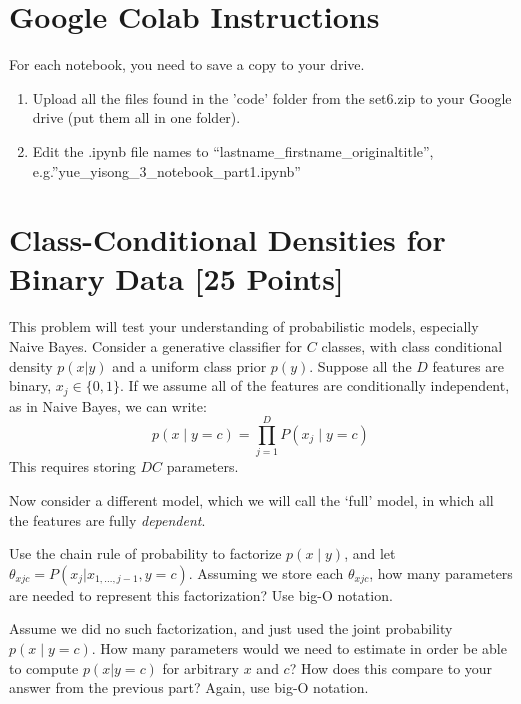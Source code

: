 \section*{Google Colab Instructions}

For each notebook, you need to save a copy to your drive.

\begin{enumerate}
	\item Upload all the files found in the 'code' folder from the set6.zip to your Google drive (put them all in one folder).
	\item Edit the .ipynb file names to “lastname_firstname_originaltitle”, e.g.”yue_yisong_3_notebook_part1.ipynb”
\end{enumerate}

\newpage


\section{Class-Conditional Densities for Binary Data [25 Points]}
This problem will test your understanding of probabilistic models, especially Naive Bayes.
Consider a generative classifier for $C$ classes, with class conditional density $p(x | y)$ and a uniform class prior $p(y)$. Suppose all the $D$ features are binary, $x_j \in \{0, 1 \}$. If we assume all of the features are conditionally independent, as in Naive Bayes, we can write:
$$p(x \mid y = c) = \prod_{j=1}^D P(x_j \mid y = c) $$
This requires storing $DC$ parameters. 

Now consider a different model, which we will call the `full' model, in which all the features are fully \textit{dependent}.

\problem[5] Use the chain rule of probability to factorize $p(x \mid y)$, and let $\theta_{xjc} = P(x_j | x_{1, \ldots, j - 1}, y = c)$. Assuming we store each $\theta_{xjc}$, how many parameters are needed to represent this factorization? Use big-O notation. 
\begin{subsolution}

\end{subsolution}
\newpage

\problem[5] Assume we did no such factorization, and just used the joint probability $p(x \mid y = c)$. How many parameters would we need to estimate in order be able to compute $p(x | y = c)$ for arbitrary $x$ and $c$? How does this compare to your answer from the previous part? Again, use big-O notation.
\begin{subsolution}
	
\end{subsolution}
\newpage


